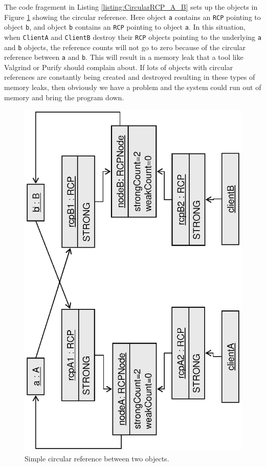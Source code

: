 \documentclass[pdf,ps2pdf,11pt]{SANDreport}
\begin{document}
The code fragement in Listing {}\ref{listing:CircularRCP_A_B} sets up
the objects in Figure {}\ref{fig:CircularRCP_A_B} showing the circular
reference.  Here object {}\texttt{a} contains an {}\texttt{RCP}
pointing to object {}\texttt{b}, and object {}\texttt{b} contains an
{}\texttt{RCP} pointing to object {}\texttt{a}.  In this situation,
when {}\texttt{ClientA} and {}\texttt{ClientB} destroy their
{}\texttt{RCP} objects pointing to the underlying {}\texttt{a} and
{}\texttt{b} objects, the reference counts will not go to zero because
of the circular reference between {}\texttt{a} and {}\texttt{b}.  This
will result in a memory leak that a tool like Valgrind or Purify
should complain about.  If lots of objects with circular references
are constantly being created and destroyed resulting in these types of
memory leaks, then obviously we have a problem and the system could
run out of memory and bring the program down.

{\bsinglespace
\begin{figure}
\begin{center}
\includegraphics*[angle=270,scale=0.65]{CircularRCP_A_B}
\end{center}
\caption{
\label{fig:CircularRCP_A_B}
Simple circular reference between two objects.  }
\end{figure}
\esinglespace}
\end{document}
